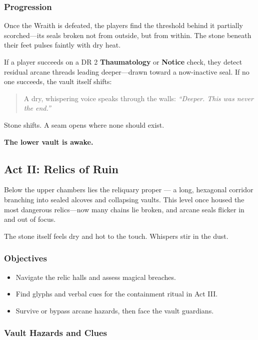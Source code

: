\subsubsection*{Progression}

Once the Wraith is defeated, the players find the threshold behind it partially scorched—its seals broken not from outside, but from within. The stone beneath their feet pulses faintly with dry heat.

If a player succeeds on a DR 2 \textbf{Thaumatology} or \textbf{Notice} check, they detect residual arcane threads leading deeper—drawn toward a now-inactive seal. If no one succeeds, the vault itself shifts:

\begin{quote}
    A dry, whispering voice speaks through the walls: \emph{“Deeper. This was never the end.”} 
\end{quote}

Stone shifts. A seam opens where none should exist.


\textbf{The lower vault is awake.}


\subsection{Act II: Relics of Ruin}

Below the upper chambers lies the reliquary proper — a long, hexagonal corridor branching into sealed alcoves and collapsing vaults. This level once housed the most dangerous relics—now many chains lie broken, and arcane seals flicker in and out of focus.

The stone itself feels dry and hot to the touch. Whispers stir in the dust.

\subsubsection*{Objectives}
\begin{itemize}\raggedright
    \item Navigate the relic halls and assess magical breaches.
    \item Find glyphs and verbal cues for the containment ritual in Act III.
    \item Survive or bypass arcane hazards, then face the vault guardians.
\end{itemize}

\subsubsection*{Vault Hazards and Clues}

